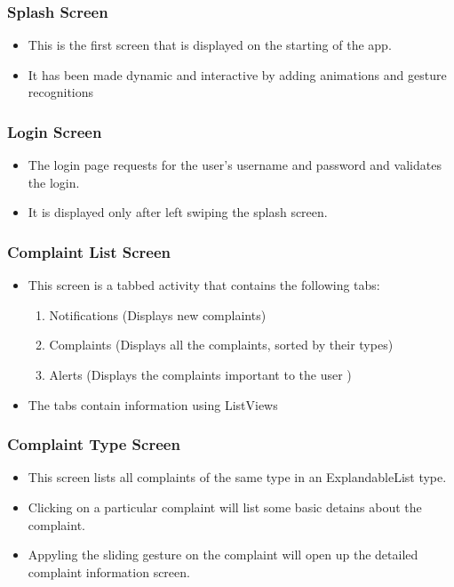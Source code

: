 \documentclass{article}
\begin{document}
    		\subsubsection{Splash Screen}
    			\begin{itemize}
    			\item This is the first screen that is displayed on the starting of the app.
    			\item It has been made dynamic and interactive by adding animations and gesture recognitions
    			\end{itemize}
    		\subsubsection{Login Screen}
    			\begin{itemize}
    			\item The login page requests for the user's username and password and validates the login.
    			\item It is displayed only after left swiping the splash screen.
    			\end{itemize}
    		\subsubsection{Complaint List Screen}
    			\begin{itemize}
    			\item This screen is a tabbed activity that contains the following tabs:
    				\begin{enumerate}
    					\item Notifications (Displays new complaints)
						\item Complaints (Displays all the complaints, sorted by their types)
						\item Alerts (Displays the complaints important to the user
						)
					\end{enumerate}
				\item The tabs contain information using ListViews
				\end{itemize}
			\subsubsection{Complaint Type Screen}    
				\begin{itemize}	
				\item This screen lists all complaints of the same type in an ExplandableList type.
				\item Clicking on a particular complaint will list some basic detains about the complaint.
				\item Appyling the sliding gesture on the complaint will open up the detailed complaint information screen.
				\end{itemize}
\end{document}

